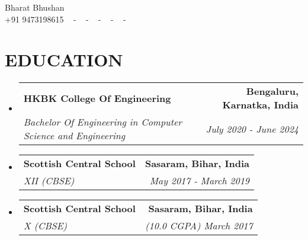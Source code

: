 \documentclass[letterpaper,11pt]{article}
\makeatletter
\newcommand{\resumeSubheading}[4]{
  \vspace{-2pt}\item
    \begin{tabular*}{1.0\textwidth}[t]{l@{\extracolsep{\fill}}r}
      \textbf{\large#1} & \textbf{\small #2} \\
      \textit{\large#3} & \textit{\small #4} \\
      
    \end{tabular*}\vspace{-7pt}
}
\newcommand{\resumeSubHeadingListStart}{\begin{itemize}[leftmargin=0.0in, label={}]}
\newcommand{\resumeSubHeadingListEnd}{\end{itemize}}
\makeatother
\begin{document}


\begin{center}
    {\huge Bharat Bhushan} \\ \vspace{2pt} 
    {+91 9473198615} ~ 
     \small{-}
    \href{https://linktr.ee/Bharat_29_11}{\color{blue}{Linktree}} ~ 
    \small{-}
    \small{}
    \href{https://ibharatbhushan.netlify.app/}{\color{blue}{Portfolio}} ~ 
    \small{-}
    \href{https://mail.google.com/}{\color{blue}{bbjee2019@gmail.com}} ~ 
    \small{-}
    \href{https://www.linkedin.com/in/bhushan9473}{ \color{blue}{linkedin}}  ~
    \small{-}
    \href{https://github.com/1uzumakinaruto}{ \color{blue}{github}} ~
    \vspace{-7pt}
\end{center}

\section{\color{airforceblue}EDUCATION}
 \resumeSubHeadingListStart
    \resumeSubheading
      {HKBK College Of Engineering}{Bengaluru, Karnatka, India}
      {Bachelor Of Engineering in Computer Science and Engineering}{July 2020 - June 2024}
    \vspace{-4pt}
     \resumeSubheading
      {Scottish Central School}{Sasaram, Bihar, India}
      {XII (CBSE)}{May 2017 - March 2019}
      \vspace{-4pt}
     \resumeSubheading
      {Scottish Central School}{Sasaram, Bihar, India}
      {X (CBSE)}{(10.0 CGPA) March 2017}
  \resumeSubHeadingListEnd
  \vspace{10pt}


\end{document}
